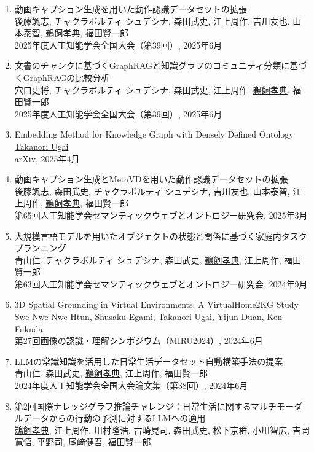 \documentclass[dvipdfmx]{jlreq}
\begin{document}
\begin{enumerate}
\begin{enumerate}
\begin{enumerate}[label=\arabic*,align=right, labelsep=3pt]
2025年度人工知能学会全国大会（第39回）, 2025年6月
\item 動画キャプション生成を用いた動作認識データセットの拡張\\
後藤颯志, チャクラボルティ シュデシナ, 森田武史, 江上周作, 吉川友也, 山本泰智, \underline{鵜飼孝典}, 福田賢一郎\\
2025年度人工知能学会全国大会（第39回）, 2025年6月
\item 文書のチャンクに基づくGraphRAGと知識グラフのコミュニティ分類に基づくGraphRAGの比較分析\\
穴口史将, チャクラボルティ シュデシナ, 森田武史, 江上周作, \underline{鵜飼孝典}, 福田賢一郎\\
2025年度人工知能学会全国大会（第39回）, 2025年6月
\item Embedding Method for Knowledge Graph with Densely Defined Ontology\\
\underline{Takanori Ugai}\\
arXiv, 2025年4月
\item 動画キャプション生成とMetaVDを用いた動作認識データセットの拡張\\
後藤颯志, 森田武史, チャクラボルティ シュデシナ, 吉川友也, 山本泰智, 江上周作, \underline{鵜飼孝典}, 福田賢一郎\\
第65回人工知能学会セマンティックウェブとオントロジー研究会, 2025年3月
\item 大規模言語モデルを用いたオブジェクトの状態と関係に基づく家庭内タスクプランニング\\
青山仁, チャクラボルティ シュデシナ, 森田武史, \underline{鵜飼孝典}, 江上周作, 福田賢一郎\\
第63回人工知能学会セマンティックウェブとオントロジー研究会, 2024年9月
\item 3D Spatial Grounding in Virtual Environments: A VirtualHome2KG Study\\
Swe Nwe Nwe Htun, Shusaku Egami, \underline{Takanori Ugai}, Yijun Duan, Ken Fukuda\\
第27回画像の認識・理解シンポジウム（MIRU2024）, 2024年6月
\item LLMの常識知識を活用した日常生活データセット自動構築手法の提案\\
青山仁, 森田武史, \underline{鵜飼孝典}, 江上周作, 福田賢一郎\\
2024年度人工知能学会全国大会論文集（第38回）, 2024年6月
\item 第2回国際ナレッジグラフ推論チャレンジ：日常生活に関するマルチモーダルデータからの行動の予測に対するLLMへの適用\\
\underline{鵜飼孝典}, 江上周作, 川村隆浩, 古崎晃司, 森田武史, 松下京群, 小川智広, 吉岡寛悟, 平野司, 尾﨑健吾, 福田賢一郎\\

\end{enumerate}
\end{enumerate}
\end{enumerate}
\end{document}
